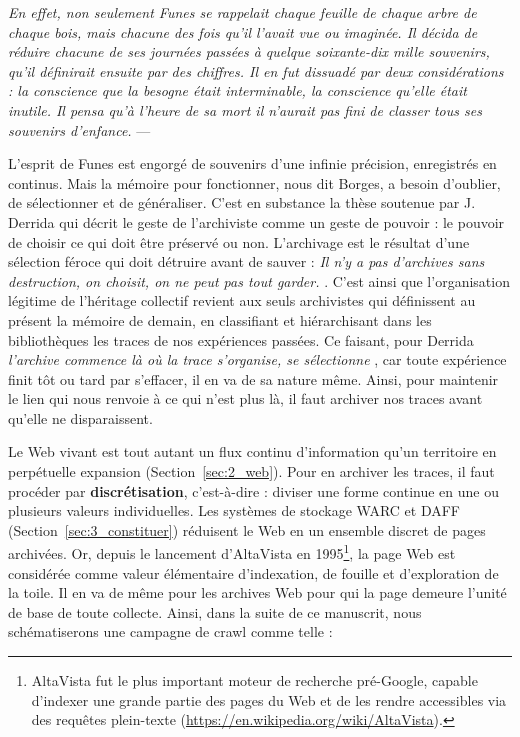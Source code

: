 \documentclass[symmetric,justified,marginals=raggedouter]{tufte-book}
\begin{document}
\begin{fullwidth}
\og\textit{En effet, non seulement Funes se rappelait chaque feuille de chaque arbre de chaque bois, mais chacune des fois qu'il l'avait vue ou imaginée. Il décida de réduire chacune de ses journées passées à quelque soixante-dix mille souvenirs, qu'il définirait ensuite par des chiffres. Il en fut dissuadé par deux considérations : la conscience que la besogne était interminable, la conscience qu'elle était inutile. Il pensa qu'à l'heure de sa mort il n'aurait pas fini de classer tous ses souvenirs d'enfance.}\fg{} --- \citep[p.116-117]{borges_fictions_1974}\\
\end{fullwidth}

\noindent L'esprit de Funes est engorgé de souvenirs d'une infinie précision, enregistrés en continus. Mais la mémoire pour fonctionner, nous dit Borges, a besoin d'oublier, de sélectionner et de généraliser. C'est en substance la thèse soutenue par J. Derrida qui décrit le geste de l'archiviste comme un geste de pouvoir : le pouvoir de choisir ce qui doit être préservé ou non. L'archivage est le résultat d'une sélection féroce qui doit détruire avant de sauver : \og\textit{Il n'y a pas d'archives sans destruction, on choisit, on ne peut pas tout garder.}\fg{} \citep[p.60]{derrida_trace_2014}. C'est ainsi que l'organisation légitime de l'héritage collectif revient aux seuls archivistes qui définissent au présent la mémoire de demain, en classifiant et hiérarchisant dans les bibliothèques les traces de nos expériences passées. Ce faisant, pour Derrida \og\textit{l'archive commence là où la trace s'organise, se sélectionne}\fg{} \citep[p.61]{derrida_trace_2014}, car toute expérience finit tôt ou tard par s'effacer, il en va de sa nature même. Ainsi, pour maintenir le lien qui nous renvoie à ce qui n'est plus là, il faut archiver nos traces avant qu'elle ne disparaissent. 

Le Web vivant est tout autant un flux continu d'information qu'un territoire en perpétuelle expansion (Section~\ref{sec:2_web}). Pour en archiver les traces, il faut procéder par \textbf{discrétisation}, c'est-à-dire : diviser une forme continue en une ou plusieurs valeurs individuelles. Les systèmes de stockage WARC et DAFF (Section~\ref{sec:3_constituer}) réduisent le Web en un ensemble discret de pages archivées. Or, depuis le lancement d'AltaVista en 1995\footnote{\RaggedOuter AltaVista fut le plus important moteur de recherche pré-Google, capable d'indexer une grande partie des pages du Web et de les rendre accessibles via des requêtes plein-texte (\url{https://en.wikipedia.org/wiki/AltaVista}).}, la page Web est considérée comme valeur élémentaire d'indexation, de fouille et d'exploration de la toile. Il en va de même pour les archives Web pour qui la page demeure l'unité de base de toute collecte. Ainsi, dans la suite de ce manuscrit, nous schématiserons une campagne de crawl comme telle : 
\end{document}
